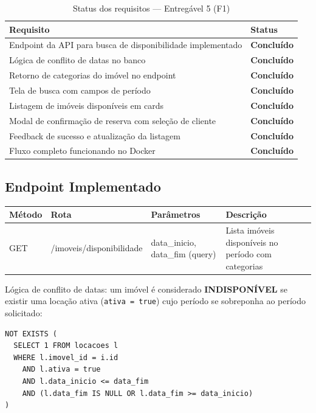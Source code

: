 \documentclass[12pt, a4paper]{article}
\newcommand{\thead}[1]{\cellcolor{tableheader}\color{white}\bfseries #1}
\newcommand{\talt}{\rowcolor{tablerowalt}}
\newcommand{\tok}{\textcolor{successgreen}{\textbf{Concluído}}}
\begin{document}
\begin{table}[H]
\centering
\begin{tabularx}{\textwidth}{|X|l|}
\hline
\thead{Requisito} & \thead{Status} \\
\hline
Endpoint da API para busca de disponibilidade implementado & \tok \\
\talt Lógica de conflito de datas no banco & \tok \\
Retorno de categorias do imóvel no endpoint & \tok \\
\talt Tela de busca com campos de período & \tok \\
Listagem de imóveis disponíveis em cards & \tok \\
\talt Modal de confirmação de reserva com seleção de cliente & \tok \\
Feedback de sucesso e atualização da listagem & \tok \\
\talt Fluxo completo funcionando no Docker & \tok \\
\hline
\end{tabularx}
\caption{Status dos requisitos — Entregável 5 (F1)}
\end{table}

\subsection{Endpoint Implementado}

\begin{table}[H]
\centering
\begin{tabularx}{\textwidth}{|l|l|l|X|}
\hline
\thead{Método} & \thead{Rota} & \thead{Parâmetros} & \thead{Descrição} \\
\hline
GET & /imoveis/disponibilidade & data\_inicio, data\_fim (query) & Lista imóveis disponíveis no período com categorias \\
\hline
\end{tabularx}
\end{table}

Lógica de conflito de datas: um imóvel é considerado \textbf{INDISPONÍVEL} se existir uma locação ativa (\texttt{ativa = true}) cujo período se sobreponha ao período solicitado:

\begin{lstlisting}[language=SQL2]
NOT EXISTS (
  SELECT 1 FROM locacoes l
  WHERE l.imovel_id = i.id
    AND l.ativa = true
    AND l.data_inicio <= data_fim
    AND (l.data_fim IS NULL OR l.data_fim >= data_inicio)
)
\end{lstlisting}
\end{document}
